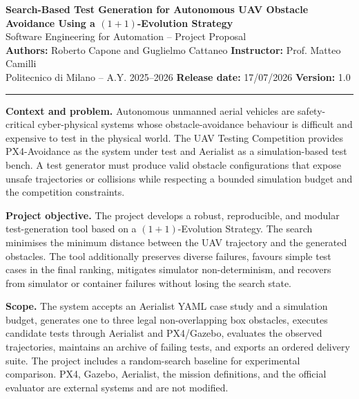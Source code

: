 \documentclass[10pt,a4paper]{article}
\begin{document}
\begin{center}
{\Large\bfseries Search-Based Test Generation for Autonomous UAV Obstacle Avoidance Using a $(1+1)$-Evolution Strategy}\\[4pt]
{\large Software Engineering for Automation -- Project Proposal}\\[4pt]
\textbf{Authors:} Roberto Capone and Guglielmo Cattaneo \quad
\textbf{Instructor:} Prof. Matteo Camilli\\[2pt]
Politecnico di Milano -- A.Y. 2025--2026 \quad
\textbf{Release date:} 17/07/2026 \quad
\textbf{Version:} 1.0
\end{center}

\vspace{-2mm}
\hrule
\vspace{2mm}

\textbf{Context and problem.}
Autonomous unmanned aerial vehicles are safety-critical cyber-physical systems whose obstacle-avoidance behaviour is difficult and expensive to test in the physical world. The UAV Testing Competition provides PX4-Avoidance as the system under test and Aerialist as a simulation-based test bench. A test generator must produce valid obstacle configurations that expose unsafe trajectories or collisions while respecting a bounded simulation budget and the competition constraints.

\textbf{Project objective.}
The project develops a robust, reproducible, and modular test-generation tool based on a $(1+1)$-Evolution Strategy. The search minimises the minimum distance between the UAV trajectory and the generated obstacles. The tool additionally preserves diverse failures, favours simple test cases in the final ranking, mitigates simulator non-determinism, and recovers from simulator or container failures without losing the search state.

\textbf{Scope.}
The system accepts an Aerialist YAML case study and a simulation budget, generates one to three legal non-overlapping box obstacles, executes candidate tests through Aerialist and PX4/Gazebo, evaluates the observed trajectories, maintains an archive of failing tests, and exports an ordered delivery suite. The project includes a random-search baseline for experimental comparison. PX4, Gazebo, Aerialist, the mission definitions, and the official evaluator are external systems and are not modified.
\end{document}
